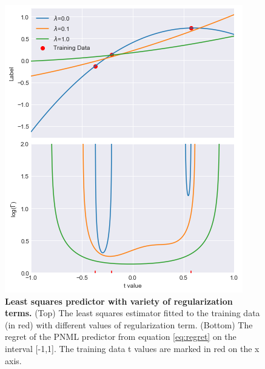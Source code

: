 \documentclass[conference,letterpaper]{IEEEtran}
\begin{document}
\begin{figure}[h] 
    \centering
    \includegraphics[width=\linewidth]{figures/least_sqaures_with_regularization.jpg}
    \caption{\textbf{Least squares predictor with variety of regularization terms.} (Top) The least squares estimator fitted to the training data (in red) with different values of regularization term. (Bottom) The regret of the PNML predictor from equation \ref{eq:regret} on the interval [-1,1]. The training data t values are marked in red on the x axis.}
    \label{fig:least_squares_with_reg}
\end{figure}
\end{document}
